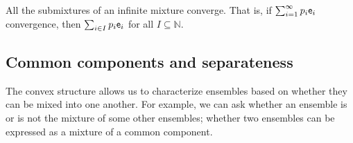 \begin{conj}
	All the submixtures of an infinite mixture converge. That is, if $\sum_{i=1}^{\infty} p_i \mathsf{e}_i$ convergence, then $\sum_{i \in I} p_i \mathsf{e}_i$ for all $I \subseteq \mathbb{N}$.
\end{conj}

\subsection{Common components and separateness}

The convex structure allows us to characterize ensembles based on whether they can be mixed into one another. For example, we can ask whether an ensemble is or is not the mixture of some other ensembles; whether two ensembles can be expressed as a mixture of a common component.

